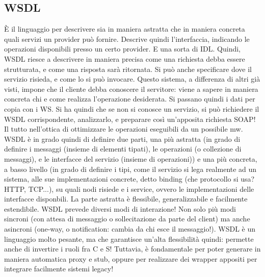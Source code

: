 \subsection{WSDL}
È il linguaggio per descrivere sia in maniera astratta che in maniera concreta quali servizi un provider può fornire.
Descrive quindi l'interfaccia, indicando le operazioni disponibili presso un certo provider. E una sorta di IDL. 
Quindi, WSDL riesce a descrivere in maniera precisa come una richiesta debba essere strutturata, e come una risposta
sarà ritornata. Si può anche specificare dove il servizio risieda, e come lo si può invocare.
Questo sistema, a differenza di altri già visti, impone che il cliente debba conoscere il servitore: viene a sapere in
maniera concreta chi e come realizza l'operazione desiderata. Si passano quindi i dati per copia con i WS. Si ha quindi
che se non si conosce un servizio, si può richiedere il WSDL corrispondente, analizzarlo, e preparare così un'apposita
richiesta SOAP! Il tutto nell'ottica di ottimizzare le operazioni eseguibili da un possibile mw.
WSDL è in grado quindi di definire due parti, una più astratta (in grado di definire i messaggi (insieme di elementi
tipati), le operazioni (o collezione di messaggi), e le interfacce del servizio (insieme di operazioni)) e una più
concreta, a basso livello (in grado di definire i tipi, come il servizio si lega realmente ad un sistema, alle sue
implementazioni concrete, detto binding (che protocollo si usa? HTTP, TCP...), su quali nodi risiede e i service,
ovvero le implementazioni delle interfacce disponbili. La parte astratta è flessibile, generalizzabile e facilmente
estendibile.
WSDL prevede diversi modi di interazione! Non solo più modi sincroni (con attesa di messaggio o sollecitazione da 
parte del client) ma anche asincroni (one-way, o notification: cambia da chi esce il messaggio!).
WSDL è un linguaggio molto pesante, ma che garantisce un'alta flessibilità quindi: permette anche di invertire i ruoli
fra C e S! Tuttavia, è fondamentale per poter generare in maniera automatica proxy e stub, oppure per realizzare
dei wrapper appositi per integrare facilmente sistemi legacy!
